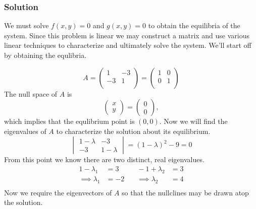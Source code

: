 \documentclass[12pt]{article}
\begin{document}
\subsubsection*{Solution}
We must solve $f(x,y)=0$ and $g(x,y)=0$ to obtain the equilibria of the system.
Since this problem is linear we may construct a matrix and use various linear
techniques to characterize and ultimately solve the system. We'll start off by
obtaining the equlibria.

\begin{equation*}
  A = \begin{pmatrix}1&-3\\-3&1\\\end{pmatrix}
  = \begin{pmatrix}1&0\\0&1\\\end{pmatrix}
\end{equation*}
The null space of $A$ is
$$\begin{pmatrix}x\\y\end{pmatrix} = \begin{pmatrix}0\\0\end{pmatrix},$$ which
implies that the equlibrium point is $(0,0)$. Now we will find the eigenvalues of
$A$ to characterize the solution about its equilibrium.
\begin{equation*}
  \begin{vmatrix}1-\lambda&-3\\-3&1-\lambda\end{vmatrix} = {(1-\lambda)}^2 - 9 = 0
\end{equation*}
From this point we know there are two distinct, real eigenvalues.
\begin{equation*}
  \begin{aligned}
    1-\lambda_1&=3 &\quad -1+\lambda_2&=3 \\
    \implies\lambda_1 &=-2 &\quad \implies\lambda_2 &= 4 \\
  \end{aligned}
\end{equation*}
Now we require the eigenvectors of $A$ so that the nullclines may be drawn atop
the solution.
\end{document}
